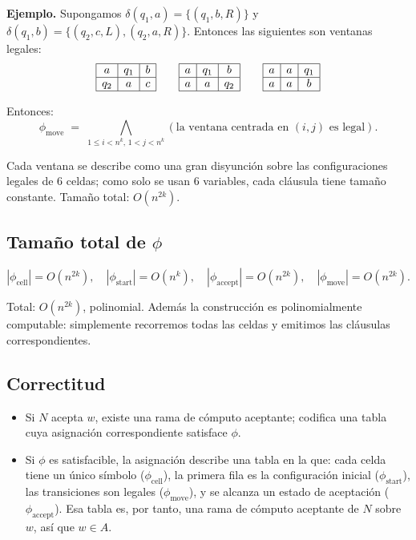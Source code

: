 \documentclass[11pt,a4paper]{article}
\theoremstyle{definicion}
\begin{document}
\textbf{Ejemplo.}\quad
Supongamos $\delta(q_1, a) = \{(q_1, b, R)\}$ y $\delta(q_1, b) = \{(q_2, c, L), (q_2, a, R)\}$. Entonces las siguientes son ventanas legales:
\[
\begin{array}{|c|c|c|}\hline a & q_1 & b \\ \hline q_2 & a & c \\ \hline\end{array} \qquad
\begin{array}{|c|c|c|}\hline a & q_1 & b \\ \hline a & a & q_2 \\ \hline\end{array} \qquad
\begin{array}{|c|c|c|}\hline a & a & q_1 \\ \hline a & a & b \\ \hline\end{array}
\]

Entonces:
\[
\phi_{\text{move}} \;=\; \bigwedge_{1 \leq i < n^k,\, 1 < j < n^k} (\text{la ventana centrada en } (i, j) \text{ es legal}).
\]

Cada ventana se describe como una gran disyunción sobre las configuraciones legales de 6 celdas; como solo se usan 6 variables, cada cláusula tiene tamaño constante. Tamaño total: $O(n^{2k})$.

\subsection{Tamaño total de $\phi$}

\[
|\phi_{\text{cell}}| = O(n^{2k}), \quad |\phi_{\text{start}}| = O(n^k), \quad |\phi_{\text{accept}}| = O(n^{2k}), \quad |\phi_{\text{move}}| = O(n^{2k}).
\]

Total: $O(n^{2k})$, polinomial. Además la construcción es polinomialmente computable: simplemente recorremos todas las celdas y emitimos las cláusulas correspondientes.

\subsection{Correctitud}

\begin{itemize}
    \item Si $N$ acepta $w$, existe una rama de cómputo aceptante; codifica una tabla cuya asignación correspondiente satisface $\phi$.
    \item Si $\phi$ es satisfacible, la asignación describe una tabla en la que: cada celda tiene un único símbolo ($\phi_{\text{cell}}$), la primera fila es la configuración inicial ($\phi_{\text{start}}$), las transiciones son legales ($\phi_{\text{move}}$), y se alcanza un estado de aceptación ($\phi_{\text{accept}}$). Esa tabla es, por tanto, una rama de cómputo aceptante de $N$ sobre $w$, así que $w \in A$.
\end{itemize}
\end{document}
